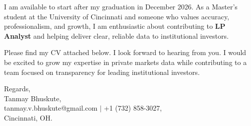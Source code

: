 \documentclass[11pt]{letter}
\begin{document}
\begin{letter}{}
I am available to start after my graduation in December 2026. As a Master's student at the University of Cincinnati and someone who values accuracy, professionalism, and growth, I am enthusiastic about contributing to \textbf{LP Analyst} and helping deliver clear, reliable data to institutional investors.

Please find my CV attached below. I look forward to hearing from you. I would be excited to grow my expertise in private markets data while contributing to a team focused on transparency for leading institutional investors.

{\setlength{\parskip}{0pt}
Regards,\\
Tanmay Bhuskute,\\
tanmay.v.bhuskute@gmail.com $\mid$ +1 (732) 858-3027,\\
Cincinnati, OH.
}

\end{letter}
\end{document}
